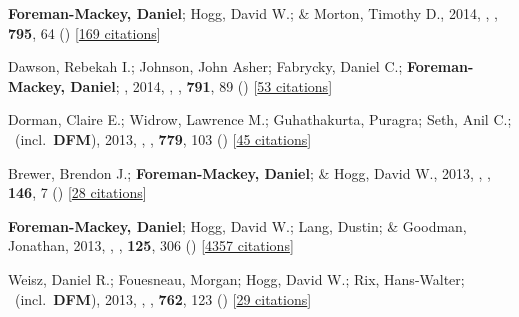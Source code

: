 \item[{\color{numcolor}\scriptsize6}] \textbf{Foreman-Mackey, Daniel}; Hogg, David W.; \& Morton, Timothy D., 2014, , \apj, \textbf{795}, 64 () [\href{https://ui.adsabs.harvard.edu/abs/2014ApJ...795...64F}{169 citations}]

\item[{\color{numcolor}\scriptsize5}] Dawson, Rebekah I.; Johnson, John Asher; Fabrycky, Daniel C.; \textbf{Foreman-Mackey, Daniel}; \etal, 2014, , \apj, \textbf{791}, 89 () [\href{https://ui.adsabs.harvard.edu/abs/2014ApJ...791...89D}{53 citations}]

\item[{\color{numcolor}\scriptsize4}] Dorman, Claire E.; Widrow, Lawrence M.; Guhathakurta, Puragra; Seth, Anil C.; \etal\ (incl.\ \textbf{DFM}), 2013, , \apj, \textbf{779}, 103 () [\href{https://ui.adsabs.harvard.edu/abs/2013ApJ...779..103D}{45 citations}]

\item[{\color{numcolor}\scriptsize3}] Brewer, Brendon J.; \textbf{Foreman-Mackey, Daniel}; \& Hogg, David W., 2013, , \aj, \textbf{146}, 7 () [\href{https://ui.adsabs.harvard.edu/abs/2013AJ....146....7B}{28 citations}]

\item[{\color{numcolor}\scriptsize2}] \textbf{Foreman-Mackey, Daniel}; Hogg, David W.; Lang, Dustin; \& Goodman, Jonathan, 2013, , \pasp, \textbf{125}, 306 () [\href{https://ui.adsabs.harvard.edu/abs/2013PASP..125..306F}{4357 citations}]

\item[{\color{numcolor}\scriptsize1}] Weisz, Daniel R.; Fouesneau, Morgan; Hogg, David W.; Rix, Hans-Walter; \etal\ (incl.\ \textbf{DFM}), 2013, , \apj, \textbf{762}, 123 () [\href{https://ui.adsabs.harvard.edu/abs/2013ApJ...762..123W}{29 citations}]